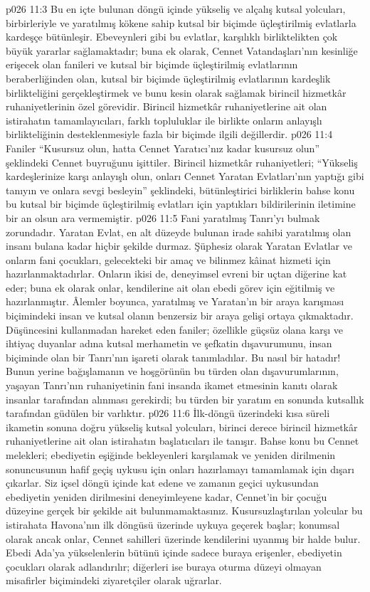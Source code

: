 \vs p026 11:3 Bu en içte bulunan döngü içinde yükseliş ve alçalış kutsal yolcuları, birbirleriyle ve yaratılmış kökene sahip kutsal bir biçimde üçleştirilmiş evlatlarla kardeşçe bütünleşir. Ebeveynleri gibi bu evlatlar, karşılıklı birliktelikten çok büyük yararlar sağlamaktadır; buna ek olarak, Cennet Vatandaşları’nın kesinliğe erişecek olan fanileri ve kutsal bir biçimde üçleştirilmiş evlatlarının beraberliğinden olan, kutsal bir biçimde üçleştirilmiş evlatlarının kardeşlik birlikteliğini gerçekleştirmek ve bunu kesin olarak sağlamak birincil hizmetkâr ruhaniyetlerinin özel görevidir. Birincil hizmetkâr ruhaniyetlerine ait olan istirahatın tamamlayıcıları, farklı topluluklar ile birlikte onların anlayışlı birlikteliğinin desteklenmesiyle fazla bir biçimde ilgili değillerdir.
\vs p026 11:4 Faniler “Kusursuz olun, hatta Cennet Yaratıcı’nız kadar kusursuz olun” şeklindeki Cennet buyruğunu işittiler. Birincil hizmetkâr ruhaniyetleri; “Yükseliş kardeşlerinize karşı anlayışlı olun, onları Cennet Yaratan Evlatları’nın yaptığı gibi tanıyın ve onlara sevgi besleyin” şeklindeki, bütünleştirici birliklerin bahse konu bu kutsal bir biçimde üçleştirilmiş evlatları için yaptıkları bildirilerinin iletimine bir an olsun ara vermemiştir.
\vs p026 11:5 Fani yaratılmış Tanrı’yı bulmak zorundadır. Yaratan Evlat, en alt düzeyde bulunan irade sahibi yaratılmış olan insanı bulana kadar hiçbir şekilde durmaz. Şüphesiz olarak Yaratan Evlatlar ve onların fani çocukları, gelecekteki bir amaç ve bilinmez kâinat hizmeti için hazırlanmaktadırlar. Onların ikisi de, deneyimsel evreni bir uçtan diğerine kat eder; buna ek olarak onlar, kendilerine ait olan ebedi görev için eğitilmiş ve hazırlanmıştır. Âlemler boyunca, yaratılmış ve Yaratan’ın bir araya karışması biçimindeki insan ve kutsal olanın benzersiz bir araya gelişi ortaya çıkmaktadır. Düşüncesini kullanmadan hareket eden faniler; özellikle güçsüz olana karşı ve ihtiyaç duyanlar adına kutsal merhametin ve şefkatin dışavurumunu, insan biçiminde olan bir Tanrı’nın işareti olarak tanımladılar. Bu nasıl bir hatadır! Bunun yerine bağışlamanın ve hoşgörünün bu türden olan dışavurumlarının, yaşayan Tanrı’nın ruhaniyetinin fani insanda ikamet etmesinin kanıtı olarak insanlar tarafından alınması gerekirdi; bu türden bir yaratım en sonunda kutsallık tarafından güdülen bir varlıktır.
\vs p026 11:6 İlk\hyp{}döngü üzerindeki kısa süreli ikametin sonuna doğru yükseliş kutsal yolcuları, birinci derece birincil hizmetkâr ruhaniyetlerine ait olan istirahatın başlatıcıları ile tanışır. Bahse konu bu Cennet melekleri; ebediyetin eşiğinde bekleyenleri karşılamak ve yeniden dirilmenin sonuncusunun hafif geçiş uykusu için onları hazırlamayı tamamlamak için dışarı çıkarlar. Siz içsel döngü içinde kat edene ve zamanın geçici uykusundan ebediyetin yeniden dirilmesini deneyimleyene kadar, Cennet’in bir çocuğu düzeyine gerçek bir şekilde ait bulunmamaktasınız. Kusursuzlaştırılan yolcular bu istirahata Havona’nın ilk döngüsü üzerinde uykuya geçerek başlar; konumsal olarak ancak onlar, Cennet sahilleri üzerinde kendilerini uyanmış bir halde bulur. Ebedi Ada’ya yükselenlerin bütünü içinde sadece buraya erişenler, ebediyetin çocukları olarak adlandırılır; diğerleri ise buraya oturma düzeyi olmayan misafirler biçimindeki ziyaretçiler olarak uğrarlar.
